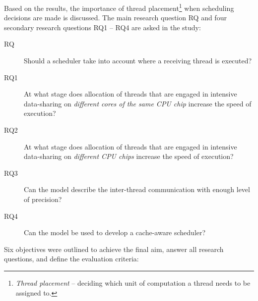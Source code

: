 Based on the results, the importance of thread placement\footnote{\textit{Thread placement} -- deciding which unit of computation a thread needs to be assigned to.} when scheduling decisions are made is discussed. The main research question RQ and four secondary research questions RQ1 -- RQ4 are asked in the study:

\begin{description}
  \item[RQ] Should a scheduler take into account where a receiving thread is executed?
  \item[RQ1] At what stage does allocation of threads that are engaged in intensive data-sharing on \textit{different cores of the same CPU chip} increase the speed of execution?
  \item[RQ2] At what stage does allocation of threads that are engaged in intensive data-sharing on \textit{different CPU chips} increase the speed of execution?
  \item[RQ3] Can the model describe the inter-thread communication with enough level of precision?
  \item[RQ4] Can the model be used to develop a cache-aware scheduler?
\end{description}

Six objectives were outlined to achieve the final aim, answer all research questions, and define the evaluation criteria:

